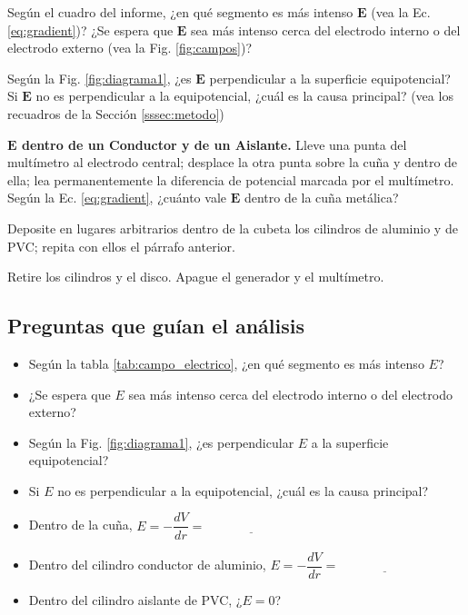 Según el cuadro del informe, ¿en qué segmento es más intenso $\mathbf{E}$ (vea la Ec. \eqref{eq:gradient})? ¿Se espera que $\mathbf{E}$ sea más intenso cerca del electrodo interno o del electrodo externo (vea la Fig. \ref{fig:campos})?

Según la Fig. \ref{fig:diagrama1}, ¿es $\mathbf{E}$ perpendicular a la superficie equipotencial? Si $\mathbf{E}$ no es perpendicular a la equipotencial, ¿cuál es la causa principal? (vea los recuadros de la Sección \ref{sssec:metodo})

\bigskip\textbf{$\mathbf{E}$ dentro de un Conductor y de un Aislante.} Lleve una punta del multímetro al electrodo central; desplace la otra punta sobre la cuña y dentro de ella; lea permanentemente la diferencia de potencial marcada por el multímetro. Según la Ec. \eqref{eq:gradient}, ¿cuánto vale $\mathbf{E}$ dentro de la cuña metálica?

Deposite en lugares arbitrarios dentro de la cubeta los cilindros de aluminio y de PVC; repita con ellos el párrafo anterior.

Retire los cilindros y el disco. Apague el generador y el multímetro.

\subsection{Preguntas que guían el análisis}

\begin{itemize}
    \item Según la tabla \ref{tab:campo_electrico}, ¿en qué segmento es más intenso $E$?

    \item ¿Se espera que $E$ sea más intenso cerca del electrodo interno o del electrodo externo?

    \item Según la Fig. \ref{fig:diagrama1}, ¿es perpendicular $E$ a la superficie equipotencial?

    \item Si $E$ no es perpendicular a la equipotencial, ¿cuál es la causa principal?

    \item Dentro de la cuña, $E = -\dfrac{dV}{dr} = \underline{\hspace{3cm}}$

    \item Dentro del cilindro conductor de aluminio, $E = -\dfrac{dV}{dr} = \underline{\hspace{3cm}}$

    \item Dentro del cilindro aislante de PVC, ¿$E = 0$?
\end{itemize}

